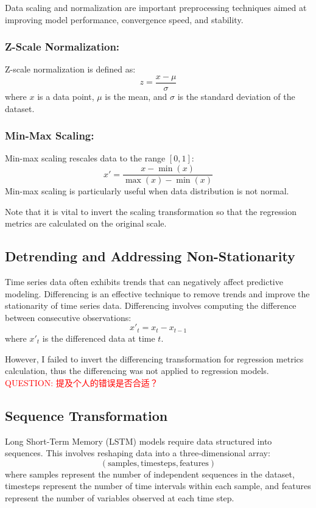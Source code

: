 Data scaling and normalization are important preprocessing techniques aimed at improving model performance, convergence speed, and stability.

\subsubsection{Z-Scale Normalization:}
Z-scale normalization is defined as:
\begin{equation}
z = \frac{x - \mu}{\sigma}
\label{eq:z_scale}
\end{equation}
where \(x\) is a data point, \(\mu\) is the mean, and \(\sigma\) is the standard deviation of the dataset. %

\subsubsection{Min-Max Scaling:}
Min-max scaling rescales data to the range \([0,1]\):
\begin{equation}
x' = \frac{x - \min(x)}{\max(x) - \min(x)}
\label{eq:min_max}
\end{equation}
Min-max scaling is particularly useful when data distribution is not normal.

Note that it is vital to invert the scaling transformation so that the regression metrics are calculated on the original scale.


\subsection{Detrending and Addressing Non-Stationarity}

Time series data often exhibits trends that can negatively affect predictive modeling. Differencing is an effective technique to remove trends and improve the stationarity of time series data. Differencing involves computing the difference between consecutive observations:
\begin{equation}
x'_t = x_t - x_{t-1}
\label{eq:differencing}
\end{equation}
where \(x'_t\) is the differenced data at time \(t\).

However, I failed to invert the differencing transformation for regression metrics calculation, thus the differencing was not applied to regression models.
\textcolor{red}{QUESTION: 提及个人的错误是否合适？}

\subsection{Sequence Transformation}

Long Short-Term Memory (LSTM) models require data structured into sequences. This involves reshaping data into a three-dimensional array:
\begin{equation}
(\text{samples}, \text{timesteps}, \text{features})
\label{eq:reshaping}
\end{equation}
where samples represent the number of independent sequences in the dataset, timesteps represent the number of time intervals within each sample, and features represent the number of variables observed at each time step.


